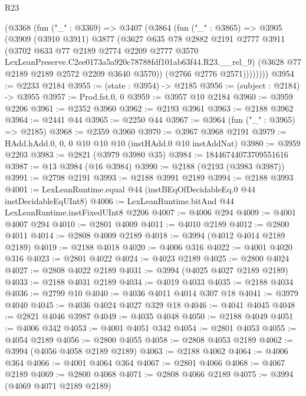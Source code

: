 \begin{lexlean}{R23}
\begin{coremodule}
        (@3368
          (fun ("_" : @3369) =>
          @3407
            (@3864
              (fun ("_" : @3865) =>
              @3905
                (@3909
                  (@3910 @3911)
                  @3877
                  (@3627
                    @635
                    @78
                    @2882
                    @2191
                    @2777
                    @3911
                    (@3702
                      @633
                      @77
                      @2189
                      @2774
                      @2209
                      @2777
                      @3570
                      LexLeanPreserve.C2ee0173a5a920c78788fdf101ab63f44.R23.__rel_9)
                    (@3628 @77 @2189 @2189 @2572 @2209 @3640 @3570))
                  (@2766 @2776 @2571))))))))
@3954 := @2233 @2184
@3955 := (state : @3954) -> @2185
@3956 := (subject : @2184) -> @3955
@3957 := Prod.fst.{0, 0}
@3959 := @3957 @10 @2184
@3960 := @3959 @2206
@3961 := @2352 @3960
@3962 := @2193 @3961
@3963 := @2188 @3962
@3964 := @2441 @44
@3965 := @2250 @44
@3967 := @3964 (fun ("_" : @3965) => @2185)
@3968 := @2359 @3960
@3970 := @3967 @3968 @2191
@3979 := HAdd.hAdd.{0, 0, 0} @10 @10 @10 (instHAdd.{0} @10 instAddNat)
@3980 := @3959 @2203
@3983 := @2821 (@3979 @3980 @35)
@3984 := 18446744073709551616
@3987 := @13 @3984 (@16 @3984)
@3990 := @2188 (@2193 (@3983 @3987))
@3991 := @2798 @2191
@3993 := @2188 @3991 @2189
@3994 := @2188 @3993
@4001 := LexLeanRuntime.equal @44 (instBEqOfDecidableEq.{0} @44 instDecidableEqUInt8)
@4006 := LexLeanRuntime.bitAnd @44 LexLeanRuntime.instFixedUInt8 @2206
@4007 := @4006 @294
@4009 := @4001 @4007 @294
@4010 := @2801 @4009
@4011 := @4010 @2189
@4012 := @2800 @4011
@4014 := @2808 @4009 @2189
@4018 := @3994 (@4012 @4014 @2189 @2189)
@4019 := @2188 @4018
@4020 := @4006 @316
@4022 := @4001 @4020 @316
@4023 := @2801 @4022
@4024 := @4023 @2189
@4025 := @2800 @4024
@4027 := @2808 @4022 @2189
@4031 := @3994 (@4025 @4027 @2189 @2189)
@4033 := @2188 @4031 @2189
@4034 := @4019 @4033
@4035 := @2188 @4034
@4036 := @2799 @10
@4040 := @4036 @4011 @4014 @307 @18
@4041 := @3979 @4040
@4045 := @4036 @4024 @4027 @329 @18
@4046 := @4041 @4045
@4048 := @2821 @4046 @3987
@4049 := @4035 @4048
@4050 := @2188 @4049
@4051 := @4006 @342
@4053 := @4001 @4051 @342
@4054 := @2801 @4053
@4055 := @4054 @2189
@4056 := @2800 @4055
@4058 := @2808 @4053 @2189
@4062 := @3994 (@4056 @4058 @2189 @2189)
@4063 := @2188 @4062
@4064 := @4006 @364
@4066 := @4001 @4064 @364
@4067 := @2801 @4066
@4068 := @4067 @2189
@4069 := @2800 @4068
@4071 := @2808 @4066 @2189
@4075 := @3994 (@4069 @4071 @2189 @2189)

\end{coremodule}
\end{lexlean}
